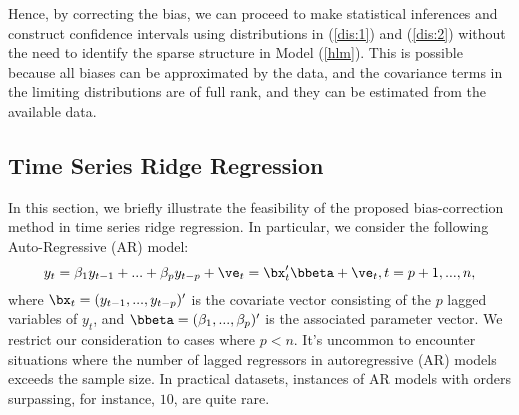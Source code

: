 Hence, by correcting the bias, we can proceed to make statistical inferences and construct confidence intervals using distributions in (\ref{dis:1}) and (\ref{dis:2}) without the need to identify the sparse structure in Model (\ref{hlm}). This is possible because all biases can be approximated by the data, and the covariance terms in the limiting distributions are of full rank, and they can be estimated from the available data.
\subsection{Time Series Ridge Regression}

In this section, we briefly illustrate the feasibility of the proposed bias-correction method in time series ridge regression. In particular, we consider the following Auto-Regressive (AR) model:
\begin{equation}\label{yt:ts}
    y_t=\beta_1 y_{t-1}+...+\beta_p y_{t-p}+\ve_t=\bx_t'\bbeta+\ve_t,t=p+1,...,n,
\end{equation}
where $\bx_t=(y_{t-1},...,y_{t-p})'$ is the covariate vector consisting of the $p$ lagged variables of $y_t$, and $\bbeta=(\beta_1,...,\beta_p)'$ is the associated parameter vector. We restrict our consideration to cases where $p<n$. It's uncommon to encounter situations where the number of lagged regressors in autoregressive (AR) models exceeds the sample size. In practical datasets, instances of AR models with orders surpassing, for instance, $10$, are quite rare.

